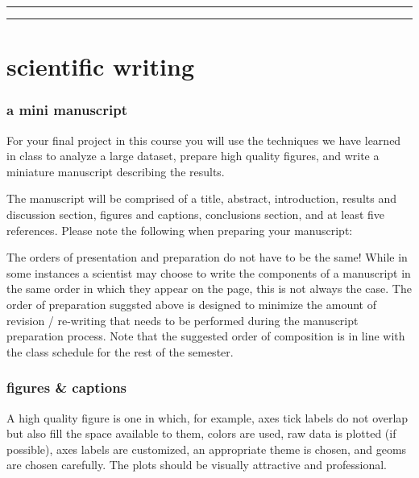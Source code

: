 \documentclass[
]{krantz}
\begin{document}
\begin{center}\rule{0.5\linewidth}{0.5pt}\end{center}

\begin{center}\rule{0.5\linewidth}{0.5pt}\end{center}

\hypertarget{part-scientific-writing}{%
\part{scientific writing}\label{part-scientific-writing}}

\hypertarget{a-mini-manuscript}{%
\section*{a mini manuscript}\label{a-mini-manuscript}}

For your final project in this course you will use the techniques we have learned in class to analyze a large dataset, prepare high quality figures, and write a miniature manuscript describing the results.

The manuscript will be comprised of a title, abstract, introduction, results and discussion section, figures and captions, conclusions section, and at least five references. Please note the following when preparing your manuscript:

The orders of presentation and preparation do not have to be the same! While in some instances a scientist may choose to write the components of a manuscript in the same order in which they appear on the page, this is not always the case. The order of preparation suggsted above is designed to minimize the amount of revision / re-writing that needs to be performed during the manuscript preparation process. Note that the suggested order of composition is in line with the class schedule for the rest of the semester.

\hypertarget{figures-captions}{%
\section{figures \& captions}\label{figures-captions}}

A high quality figure is one in which, for example, axes tick labels do not overlap but also fill the space available to them, colors are used, raw data is plotted (if possible), axes labels are customized, an appropriate theme is chosen, and geoms are chosen carefully. The plots should be visually attractive and professional.
\end{document}
